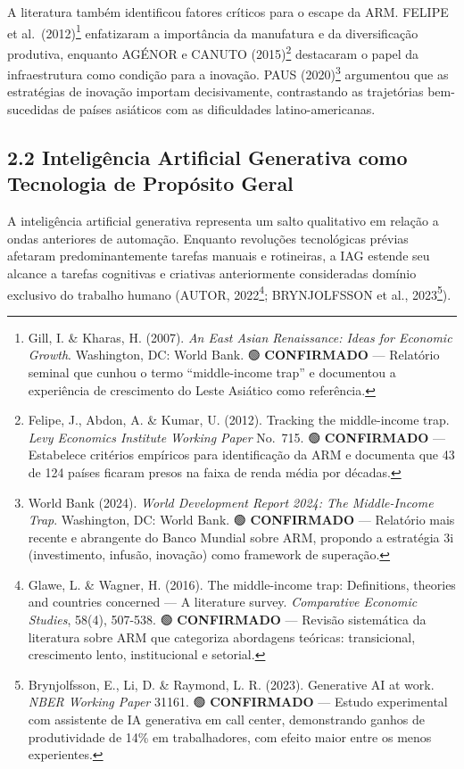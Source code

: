 \documentclass[
  brazilian,
  12pt,
]{article}
\begin{document}
A literatura também identificou fatores críticos para o escape da ARM. FELIPE et al.~(2012)\footnote{Gill, I. \& Kharas, H. (2007). \emph{An East Asian Renaissance: Ideas for Economic Growth}. Washington, DC: World Bank. 🟢 \textbf{CONFIRMADO} --- Relatório seminal que cunhou o termo ``middle-income trap'' e documentou a experiência de crescimento do Leste Asiático como referência.} enfatizaram a importância da manufatura e da diversificação produtiva, enquanto AGÉNOR e CANUTO (2015)\footnote{Felipe, J., Abdon, A. \& Kumar, U. (2012). Tracking the middle-income trap. \emph{Levy Economics Institute Working Paper} No.~715. 🟢 \textbf{CONFIRMADO} --- Estabelece critérios empíricos para identificação da ARM e documenta que 43 de 124 países ficaram presos na faixa de renda média por décadas.} destacaram o papel da infraestrutura como condição para a inovação. PAUS (2020)\footnote{World Bank (2024). \emph{World Development Report 2024: The Middle-Income Trap}. Washington, DC: World Bank. 🟢 \textbf{CONFIRMADO} --- Relatório mais recente e abrangente do Banco Mundial sobre ARM, propondo a estratégia 3i (investimento, infusão, inovação) como framework de superação.} argumentou que as estratégias de inovação importam decisivamente, contrastando as trajetórias bem-sucedidas de países asiáticos com as dificuldades latino-americanas.

\subsection{2.2 Inteligência Artificial Generativa como Tecnologia de Propósito Geral}\label{inteliguxeancia-artificial-generativa-como-tecnologia-de-propuxf3sito-geral}

A inteligência artificial generativa representa um salto qualitativo em relação a ondas anteriores de automação. Enquanto revoluções tecnológicas prévias afetaram predominantemente tarefas manuais e rotineiras, a IAG estende seu alcance a tarefas cognitivas e criativas anteriormente consideradas domínio exclusivo do trabalho humano (AUTOR, 2022\footnote{Glawe, L. \& Wagner, H. (2016). The middle-income trap: Definitions, theories and countries concerned --- A literature survey. \emph{Comparative Economic Studies}, 58(4), 507-538. 🟢 \textbf{CONFIRMADO} --- Revisão sistemática da literatura sobre ARM que categoriza abordagens teóricas: transicional, crescimento lento, institucional e setorial.}; BRYNJOLFSSON et al., 2023\footnote{Brynjolfsson, E., Li, D. \& Raymond, L. R. (2023). Generative AI at work. \emph{NBER Working Paper} 31161. 🟢 \textbf{CONFIRMADO} --- Estudo experimental com assistente de IA generativa em call center, demonstrando ganhos de produtividade de 14\% em trabalhadores, com efeito maior entre os menos experientes.}).
\end{document}

